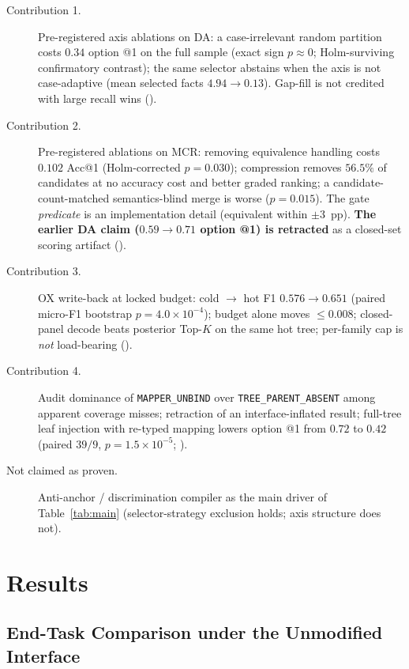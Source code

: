 \begin{description}
  \item[Contribution 1.] Pre-registered axis ablations on DA: a case-irrelevant random partition costs $0.34$ option @1 on the full sample (exact sign $p{\approx}0$; Holm-surviving confirmatory contrast); the same selector abstains when the axis is not case-adaptive (mean selected facts $4.94 \rightarrow 0.13$). Gap-fill is not credited with large recall wins ().
  \item[Contribution 2.] Pre-registered ablations on MCR: removing equivalence handling costs $0.102$ Acc@1 (Holm-corrected $p=0.030$); compression removes $56.5\%$ of candidates at no accuracy cost and better graded ranking; a candidate-count-matched semantics-blind merge is worse ($p=0.015$). The gate \emph{predicate} is an implementation detail (equivalent within $\pm 3$~pp). \textbf{The earlier DA claim ($0.59\rightarrow0.71$ option @1) is retracted} as a closed-set scoring artifact ().
  \item[Contribution 3.] OX write-back at locked budget: cold $\rightarrow$ hot F1 $0.576\rightarrow 0.651$ (paired micro-F1 bootstrap $p{=}4.0{\times}10^{-4}$); budget alone moves ${\leq}0.008$; closed-panel decode beats posterior Top-$K$ on the same hot tree; per-family cap is \emph{not} load-bearing ().
  \item[Contribution 4.] Audit dominance of \texttt{MAPPER\_UNBIND} over \texttt{TREE\_PARENT\_ABSENT} among apparent coverage misses; retraction of an interface-inflated result; full-tree leaf injection with re-typed mapping lowers option @1 from $0.72$ to $0.42$ (paired $39/9$, $p{=}1.5{\times}10^{-5}$; ).
  \item[Not claimed as proven.] Anti-anchor / discrimination compiler as the main driver of Table~\ref{tab:main} (selector-strategy exclusion holds; axis structure does not).
\end{description}

\section{Results}
\label{sec:results}

\subsection{End-Task Comparison under the Unmodified Interface}
\label{sec:main-results}

